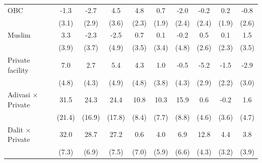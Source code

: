 {\begin{tabular}{l*{9}{c}}
\addlinespace
OBC         &        -1.3         &        -2.7         &         4.5         &         4.8\sym{**} &         0.7         &        -2.0         &        -0.2         &         0.2         &        -0.8         \\
            &       (3.1)         &       (2.9)         &       (3.6)         &       (2.3)         &       (1.9)         &       (2.4)         &       (2.4)         &       (1.9)         &       (2.6)         \\
\addlinespace
Muslim      &         3.3         &        -2.3         &        -2.5         &         0.7         &         0.1         &        -0.2         &         0.5         &         0.1         &         1.5         \\
            &       (3.9)         &       (3.7)         &       (4.9)         &       (3.5)         &       (3.4)         &       (4.8)         &       (2.6)         &       (2.3)         &       (3.5)         \\
\addlinespace
Private facility&         7.0         &         2.7         &         5.4         &         4.3         &         1.0         &        -0.5         &        -5.2\sym{*}  &        -1.5         &        -2.9         \\
            &       (4.8)         &       (4.3)         &       (4.9)         &       (4.8)         &       (3.8)         &       (4.3)         &       (2.9)         &       (2.2)         &       (3.0)         \\
\addlinespace
Adivasi $\times$ Private&        31.5         &        24.3         &        24.4         &        10.8         &        10.3         &        15.9\sym{*}  &         0.6         &        -0.2         &         1.6         \\
            &      (21.4)         &      (16.9)         &      (17.8)         &       (8.4)         &       (7.7)         &       (8.8)         &       (4.6)         &       (3.6)         &       (4.7)         \\
\addlinespace
Dalit $\times$ Private&        32.0\sym{***}&        28.7\sym{***}&        27.2\sym{***}&         0.6         &         4.0         &         6.9         &        12.8\sym{***}&         4.4         &         3.8         \\
            &       (7.3)         &       (6.9)         &       (7.5)         &       (7.0)         &       (5.9)         &       (6.6)         &       (4.3)         &       (3.2)         &       (3.9)         \\

\end{tabular}}
